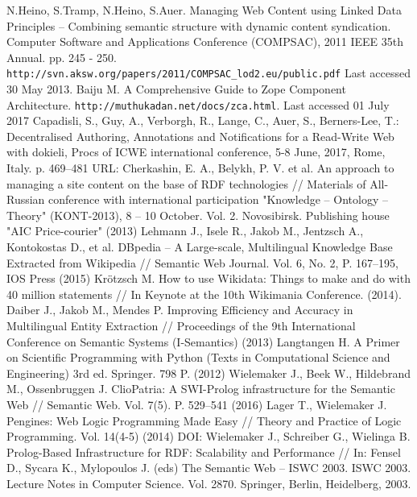 \documentclass[conference,a4paper]{IEEEtran}
\providecommand\url[1]{\texttt{#1}}
\begin{document}
\begin{thebibliography}{99}
 N.Heino, S.Tramp, N.Heino, S.Auer. Managing Web Content using Linked Data Principles – Combining semantic structure with dynamic content syndication. Computer Software and Applications Conference (COMPSAC), 2011 IEEE 35th Annual. pp. 245 - 250.  \url{http://svn.aksw.org/papers/2011/COMPSAC_lod2.eu/public.pdf}  Last accessed 30 May 2013.
  Baiju M. A Comprehensive Guide to Zope Component Architecture.
\url{http://muthukadan.net/docs/zca.html}. Last accessed 01 July 2017
  Capadisli, S., Guy, A., Verborgh, R., Lange, C., Auer, S., Berners-Lee, T.: Decentralised Authoring, Annotations and Notifications for a Read-Write Web with dokieli, Procs of ICWE international conference, 5-8 June, 2017, Rome, Italy. p. 469--481 URL: 
  Cherkashin, E. A., Belykh, P. V. et al. An approach to managing a site
  content on the base of RDF technologies // Materials of All-Russian
  conference with international participation "Knowledge -- Ontology --
  Theory" (KONT-2013), 8 -- 10 October. Vol. 2. Novosibirsk.
  Publishing house "AIC Price-courier" (2013)
  Lehmann J., Isele R., Jakob M., Jentzsch A., Kontokostas D., et al.
  DBpedia -- A Large-scale, Multilingual Knowledge Base Extracted from
  Wikipedia // Semantic Web Journal. Vol. 6, No. 2, P. 167--195,
  IOS Press (2015)
  Krötzsch M. How to use Wikidata: Things to make and do with 40 million
  statements // In Keynote at the 10th Wikimania Conference. (2014).
  Daiber J., Jakob M., Mendes P. Improving Efficiency and Accuracy in
  Multilingual Entity Extraction // Proceedings of the 9th International
  Conference on Semantic Systems (I-Semantics) (2013)
  Langtangen H. A Primer on Scientific Programming with Python (Texts in
  Computational Science and Engineering) 3rd ed. Springer. 798 P. (2012)
  Wielemaker J., Beek W., Hildebrand M., Ossenbruggen J. ClioPatria: A
  SWI-Prolog infrastructure for the Semantic Web // Semantic Web.
  Vol. 7(5). P. 529--541 (2016) 
  Lager T., Wielemaker J. Pengines: Web Logic Programming Made Easy //
  Theory and Practice of Logic Programming. Vol. 14(4-5) (2014)
DOI: 
  Wielemaker J., Schreiber G., Wielinga B. Prolog-Based Infrastructure
  for RDF: Scalability and Performance // In: Fensel D., Sycara K.,
  Mylopoulos J. (eds) The Semantic Web -- ISWC 2003. ISWC 2003. Lecture
  Notes in Computer Science. Vol. 2870. Springer, Berlin,
  Heidelberg, 2003.

\end{thebibliography}
\end{document}
